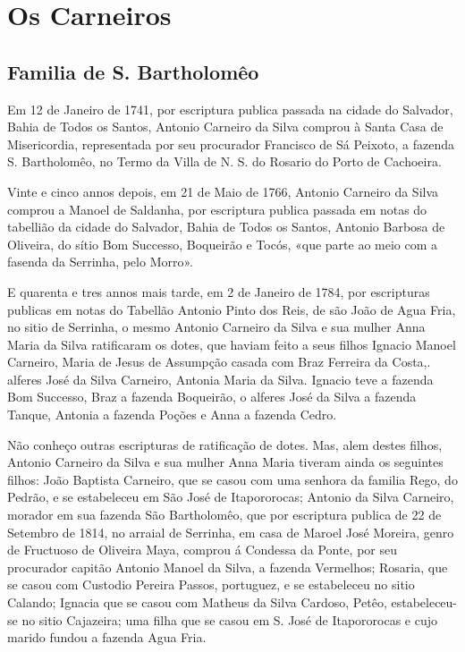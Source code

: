 \chapter{Os Carneiros}
\section*{Familia de S. Bartholomêo}

Em 12 de Janeiro de 1741, por escriptura publica passada na cidade do Salvador, Bahia de Todos os Santos, Antonio Carneiro da Silva comprou à Santa Casa de Misericordia, representada por seu procurador Francisco de Sá Peixoto, a fazenda S. Bartholomêo, no Termo da Villa de N. S. do Rosario do Porto de Cachoeira.

Vinte e cinco annos depois, em 21 de Maio de 1766, Antonio Carneiro da Silva comprou a Manoel de Saldanha, por escriptura publica passada em notas do tabellião da cidade do Salvador, Bahia de Todos os Santos, Antonio Barbosa de Oliveira, do sítio Bom Successo, Boqueirão e Tocós, «que parte ao meio com a fasenda da Serrinha, pelo Morro».

E quarenta e tres annos mais tarde, em 2 de Janeiro de 1784, por escripturas publicas em notas do Tabellão Antonio Pinto dos Reis, de são João de Agua Fria, no sitio de Serrinha, o mesmo Antonio Carneiro da Silva e sua mulher Anna Maria da Silva ratificaram os dotes, que haviam feito a seus filhos Ignacio Manoel Carneiro, Maria de Jesus de Assumpção casada com Braz Ferreira da Costa,. alferes José da Silva Carneiro, Antonia Maria da Silva. Ignacio teve a fazenda Bom Successo, Braz a fazenda Boqueirão, o alferes José da Silva a fazenda Tanque, Antonia a fazenda Poções e Anna a fazenda Cedro.

Não conheço outras escripturas de ratificação de dotes. Mas, alem destes filhos, Antonio Carneiro da Silva e sua mulher Anna Maria tiveram ainda os seguintes filhos: João Baptista Carneiro, que se casou com uma senhora da familia Rego, do Pedrão, e se estabeleceu em São José de Itapororocas; Antonio da Silva Carneiro, morador em sua fazenda São  Bartholomêo, que por escriptura publica de 22 de Setembro de 1814, no arraial de Serrinha, em casa de Maroel José Moreira, genro de Fructuoso de Oliveira Maya, comprou á Condessa da Ponte, por seu procurador capitão Antonio Manoel da Silva, a fazenda Vermelhos; Rosaria, que se casou com Custodio Pereira Passos, portuguez, e se estabeleceu no sitio Calando; Ignacia que se casou com Matheus da Silva Cardoso, Petêo, estabeleceu-se no sitio Cajazeira; uma filha que se casou em S. José de Itapororocas e cujo marido fundou a fazenda Agua Fria.

